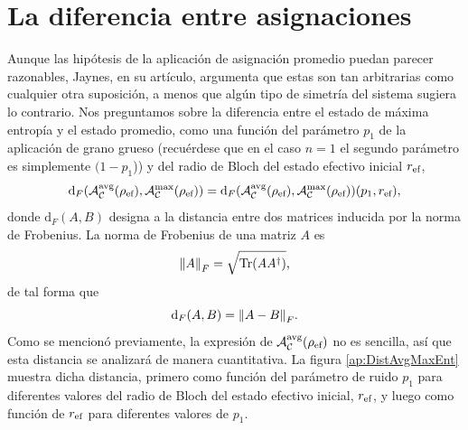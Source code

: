 \section{La diferencia entre asignaciones}

Aunque las hipótesis de la aplicación de asignación promedio puedan parecer razonables, Jaynes, en su artículo, argumenta que estas son tan arbitrarias como cualquier otra suposición, a menos que algún tipo de simetría del sistema sugiera lo contrario. Nos preguntamos sobre la diferencia entre el estado de máxima entropía y el estado promedio, como una función del parámetro $p_{1}$ de la aplicación de grano grueso (recuérdese que en el caso $n=1$ el segundo parámetro es simplemente $(1-p_{1}$)) y del radio de Bloch del estado efectivo inicial $r_{\text{ef}}$, \ie{} 
\begin{equation}\label{eq:DistAvgMaxEnt}
    \text{d}_{F}\qty(\mathcal{A}_{\mathcal{C}}^{\text{avg}}(\rho_{\text{ef}}),\mathcal{A}_{\mathcal{C}}^{\max}(\rho_{\text{ef}}))=\text{d}_{F}\qty(\mathcal{A}_{\mathcal{C}}^{\text{avg}}(\rho_{\text{ef}}),\mathcal{A}_{\mathcal{C}}^{\max}(\rho_{\text{ef}}))(p_{1},r_{\text{ef}}),\nonumber
\end{equation}
donde $\text{d}_{F}(A,B)$ designa a la distancia entre dos matrices inducida por la norma de Frobenius. La norma de Frobenius de una matriz $A$ es
\begin{equation}
  \norm{A}_{F}=\sqrt{\Tr(AA^{\dagger})},\nonumber
\end{equation}
de tal forma que
\begin{equation}
  \text{d}_{F}(A,B)=\norm{A-B}_{F}.\nonumber
\end{equation}
Como se mencionó previamente, la expresión de $\mathcal{A}_{\mathcal{C}}^{\text{avg}}(\rho_{\text{ef}})$ no es sencilla, así que esta distancia se analizará de manera cuantitativa. La figura \ref{ap:DistAvgMaxEnt} muestra dicha distancia, primero como función del parámetro de ruido $p_{1}$ para diferentes valores del radio de Bloch del estado efectivo inicial, $r_{\text{ef}}$, y luego como función de $r_{\text{ef}}$ para diferentes valores de $p_{1}$.
